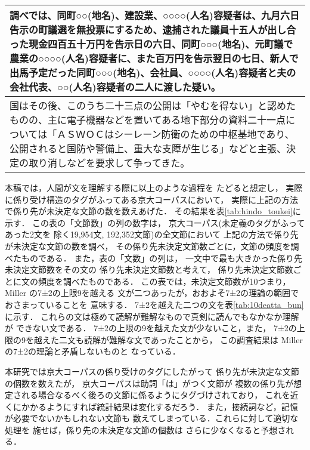 \begin{table*}[t]
\vspace{-5mm}
  \caption{係り先が未決定な文節の個数が10であった箇所を持つ文}
  \label{tab:10deatta_bun}
  \begin{center}
\small
\begin{tabular}[c]{|p{13.5cm}|}\hline 
調べでは、同町○○(地名)、建設業、○○○○(人名)容疑者は、九月六日告示の町議選を無投票にするため、逮捕された議員十五人が出し合った現金四百五十万円を告示日の六日、同町○○○(地名)、元町議で農業の○○○○(人名)容疑者に、また百万円を告示翌日の七日、新人で出馬予定だった同町○○○(地名)、会社員、○○○○(人名)容疑者と夫の会社代表、○○(人名)容疑者の二人に渡した疑い。\\\hline 
国はその後、このうち二十三点の公開は「やむを得ない」と認めたものの、主に電子機器などを置いてある地下部分の資料二十一点については「ＡＳＷＯＣはシーレーン防衛のための中枢基地であり、公開されると国防や警備上、重大な支障が生じる」などと主張、決定の取り消しなどを要求して争ってきた。\\\hline 
\end{tabular}
\end{center}
\end{table*}
本稿では，人間が文を理解する際に以上のような過程を
たどると想定し，
実際に係り受け構造のタグがふってある京大コーパスにおいて，
実際に上記の方法で係り先が未決定な文節の数を数えあげた．
その結果を表\ref{tab:hindo_toukei}に示す．
この表の「文節数」の列の数字は，
京大コーパス(未定義のタグがふってあった2文を
除く19,954文, 192,352文節)の全文節において
上記の方法で係り先が未決定な文節の数を調べ，
その係り先未決定文節数ごとに，文節の頻度を調べたものである．
また，表の「文数」の列は，
一文中で最も大きかった係り先未決定文節数をその文の
係り先未決定文節数と考えて，
係り先未決定文節数ごとに文の頻度を調べたものである．
この表では，未決定文節数が10つまり，Miller の7±2の上限9を越える
文が二つあったが，おおよそ7±2の理論の範囲でおさまっていることを
意味する．
7±2を越えた二つの文を表\ref{tab:10deatta_bun}に示す．
これらの文は極めて読解が難解なもので真剣に読んでもなかなか理解が
できない文である．
7±2の上限の9を越えた文が少ないこと，また，
7±2の上限の9を越えた二文も読解が難解な文であったことから，
この調査結果は Miller の7±2の理論と矛盾しないものと
なっている．

本研究では京大コーパスの係り受けのタグにしたがって
係り先が未決定な文節の個数を数えたが，
京大コーパスは助詞「は」がつく文節が
複数の係り先が想定される場合なるべく後ろの文節に係るようにタグづけされており，
これを近くにかかるようにすれば統計結果は変化するだろう．
また，接続詞など，記憶が必要でないかもしれない文節も
数えてしまっている．これらに対して適切な処理を
施せば，係り先の未決定な文節の個数は
さらに少なくなると予想される．

